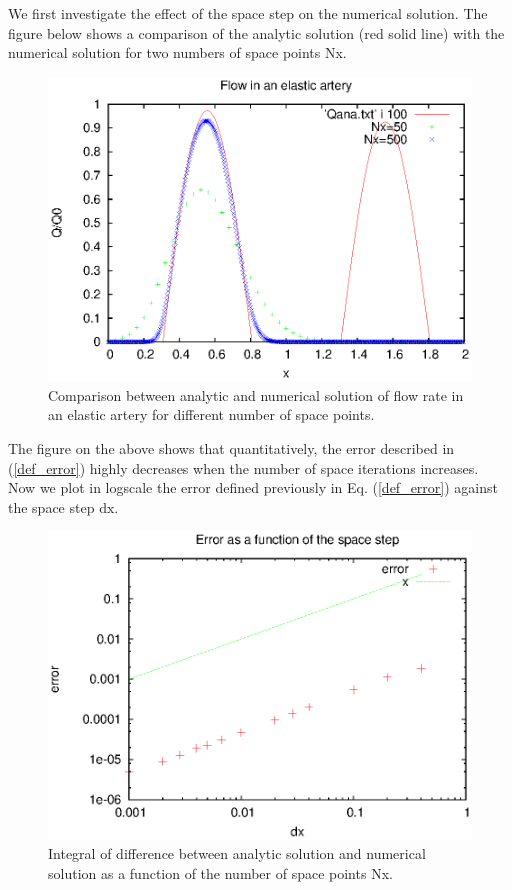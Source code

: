 \documentclass{config}
\begin{document}
We first investigate the effect of the space step on the numerical solution. The figure below shows a comparison of the analytic solution (red solid line) with the numerical solution for two numbers of space points Nx.

\begin{figure}[H]
\begin{center}
\includegraphics[scale=1]{figures/Q_Nx.eps}
\caption{Comparison between analytic and numerical solution of flow rate in an elastic artery for different number of space points.}
\label{Q_Nx}
\end{center}
\end{figure}

The figure on the above shows that quantitatively, the error described in (\ref{def_error}) highly decreases when the number of space iterations increases. \\

Now we plot in logscale the error defined previously in Eq. (\ref{def_error}) against the space step $\mathrm{dx}$.

\begin{figure}[H]
\begin{center}
\includegraphics[scale=1]{figures/err_Nx.eps}
\caption{Integral of difference between analytic solution and numerical solution as a function of the number of space points Nx.}
\label{err_dx}
\end{center}
\end{figure}
\end{document}
